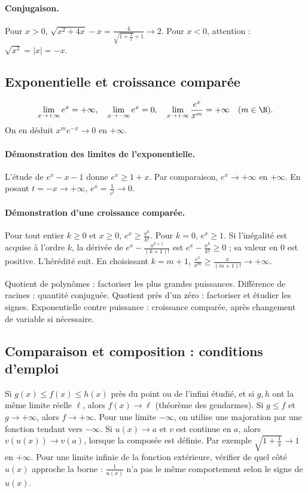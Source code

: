 \paragraph{Conjugaison.} Pour $x>0$, $\sqrt{x^2+4x}-x=\frac{4}{\sqrt{1+\frac{4}{x}}+1}\to2$. Pour $x<0$, attention : $\sqrt{x^2}=|x|=-x$.
\subsection{Exponentielle et croissance comparée}
\[\lim_{x\to+\infty}e^x=+\infty,\quad\lim_{x\to-\infty}e^x=0,\quad
\lim_{x\to+\infty}\frac{e^x}{x^m}=+\infty\quad(m\in\N).\]
On en déduit $x^me^{-x}\to0$ en $+\infty$.
\paragraph{Démonstration des limites de l'exponentielle.} L'étude de $e^x-x-1$ donne $e^x\ge1+x$. Par comparaison, $e^x\to+\infty$ en $+\infty$. En posant $t=-x\to+\infty$, $e^x=\frac{1}{e^t}\to0$.
\paragraph{Démonstration d'une croissance comparée.} Pour tout entier $k\ge0$ et $x\ge0$, $e^x\ge \frac{x^k}{k!}$. Pour $k=0$, $e^x\ge1$. Si l'inégalité est acquise à l'ordre $k$, la dérivée de $e^x-\frac{x^{k+1}}{(k+1)!}$ est $e^x-\frac{x^k}{k!}\ge0$ ; sa valeur en $0$ est positive. L'hérédité suit. En choisissant $k=m+1$, $\frac{e^x}{x^m}\ge \frac{x}{(m+1)!}\to+\infty$.
\begin{method}
Quotient de polynômes : factoriser les plus grandes puissances. Différence de racines : quantité conjuguée. Quotient près d'un zéro : factoriser et étudier les signes. Exponentielle contre puissance : croissance comparée, après changement de variable si nécessaire.
\end{method}
\subsection{Comparaison et composition : conditions d'emploi}
Si $g(x)\le f(x)\le h(x)$ près du point ou de l'infini étudié, et si $g,h$ ont la même limite réelle $\ell$, alors $f(x)\to\ell$ (théorème des gendarmes). Si $g\le f$ et $g\to+\infty$, alors $f\to+\infty$. Pour une limite $-\infty$, on utilise une majoration par une fonction tendant vers $-\infty$.
Si $u(x)\to a$ et $v$ est continue en $a$, alors $v(u(x))\to v(a)$, lorsque la composée est définie. Par exemple $\sqrt{1+\frac{1}{x}}\to1$ en $+\infty$. Pour une limite infinie de la fonction extérieure, vérifier de quel côté $u(x)$ approche la borne : $\frac{1}{u(x)}$ n'a pas le même comportement selon le signe de $u(x)$.


